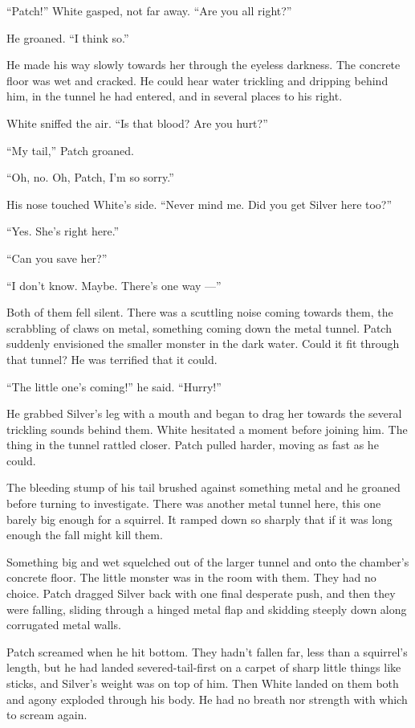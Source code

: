 \documentclass[ebook,oneside,openany,12pt]{memoir}
\begin{document}
“Patch!” White gasped, not far away. “Are you all right?”

He groaned. “I think so.”

He made his way slowly towards her through the eyeless darkness. The
concrete floor was wet and cracked. He could hear water trickling and
dripping behind him, in the tunnel he had entered, and in several
places to his right.

White sniffed the air. “Is that blood? Are you hurt?”

“My tail,” Patch groaned.

“Oh, no. Oh, Patch, I’m so sorry.”

His nose touched White’s side. “Never mind me. Did you get Silver here
too?”

“Yes. She’s right here.”

“Can you save her?”

“I don’t know. Maybe. There’s one way —”

Both of them fell silent. There was a scuttling noise coming towards
them, the scrabbling of claws on metal, something coming down the
metal tunnel. Patch suddenly envisioned the smaller monster in the
dark water. Could it fit through that tunnel? He was terrified that it
could.

“The little one’s coming!” he said. “Hurry!”

He grabbed Silver’s leg with a mouth and began to drag her towards the
several trickling sounds behind them. White hesitated a moment before
joining him. The thing in the tunnel rattled closer. Patch pulled
harder, moving as fast as he could.

The bleeding stump of his tail brushed against something metal and he
groaned before turning to investigate. There was another metal tunnel
here, this one barely big enough for a squirrel. It ramped down so
sharply that if it was long enough the fall might kill them.

Something big and wet squelched out of the larger tunnel and onto the
chamber’s concrete floor. The little monster was in the room with
them. They had no choice. Patch dragged Silver back with one final
desperate push, and then they were falling, sliding through a hinged
metal flap and skidding steeply down along corrugated metal walls.

Patch screamed when he hit bottom. They hadn’t fallen far, less than a
squirrel’s length, but he had landed severed-tail-first on a carpet of
sharp little things like sticks, and Silver’s weight was on top of
him. Then White landed on them both and agony exploded through his
body. He had no breath nor strength with which to scream again.
\end{document}
